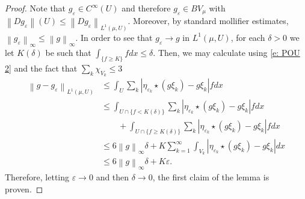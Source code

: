 \documentclass[12pt]{amsart}
\numberwithin{equation}{section}
\theoremstyle{plain}
\theoremstyle{definition}
\newcommand{\norm}[1]{\left\lVert#1\right\rVert}
\begin{document}
\begin{proof}
Note that $g_{\varepsilon} \in C^\infty(U)$ and therefore $g_{\varepsilon} \in BV_{\mu}$ with $\norm{Dg_{\varepsilon}}(U) \le \norm{Dg_{\varepsilon}}_{L^1(\mu, U)}$. Moreover, by standard mollifier estimates, $\norm{g_{\varepsilon}}_{\infty} \le \norm{g}_{\infty}$. In order to see that $g_\varepsilon \rightarrow g$ in $L^1(\mu, U)$, for each $\delta>0$ we let $K(\delta)$ be such that $\int_{\{f\ge K\}}fdx \le \delta$.  Then, we may calculate using \eqref{e: POU 2} and the fact that $\sum_k \chi_{V_k} \le 3$
\begin{align*}
    \norm{g-g_{\varepsilon}}_{L^1(\mu, U)} & \le
    \int_{U}\sum_{k}|\eta_{\varepsilon_k}\star(g\xi_k) - g\xi_k|fdx\\
    & \le \int_{U \cap \{f < K(\delta) \}}\sum_{k}|\eta_{\varepsilon_k}\star(g\xi_k) - g\xi_k|fdx\\
    & \qquad + \int_{U \cap \{f \ge K(\delta) \}}\sum_{k}|\eta_{\varepsilon_k}\star(g\xi_k) - g\xi_k|fdx\\
    & \le 6\norm{g}_{\infty}\delta + K\sum_{k=1}^{\infty} \int_{V_k}|\eta_{\varepsilon_k}\star(g\xi_k) - g\xi_k|dx\\
    & \le 6\norm{g}_{\infty}\delta + K\varepsilon.
\end{align*}
Therefore, letting $\varepsilon \rightarrow 0$ and then $\delta \rightarrow 0$, the first claim of the lemma is proven.


\end{proof}
\end{document}
